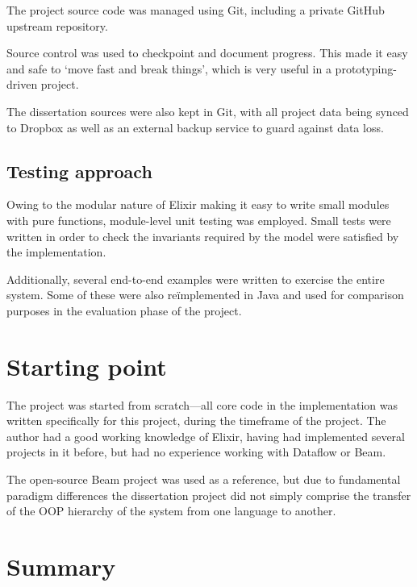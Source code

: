 The project source code was managed using Git, including a private GitHub upstream repository.

Source control was used to checkpoint and document progress.
This made it easy and safe to `move fast and break things', which is very useful in a prototyping-driven project.

The dissertation sources were also kept in Git, with all project data being synced to Dropbox as well as an external backup service to guard against data loss.

\subsection{Testing approach}\label{sec:prep:softeng:testing}

Owing to the modular nature of Elixir making it easy to write small modules with pure functions, module-level unit testing was employed.
Small tests were written in order to check the invariants required by the model were satisfied by the implementation.

Additionally, several end-to-end examples were written to exercise the entire system.
Some of these were also re\"implemented in Java and used for comparison purposes in the evaluation phase of the project.

\section{Starting point}\label{sec:prep:starting}

The project was started from scratch---all core code in the implementation was written specifically for this project, during the timeframe of the project.
The author had a good working knowledge of Elixir, having had implemented several projects in it before, but had no experience working with Dataflow or Beam.

The open-source Beam project was used as a reference, but due to fundamental paradigm differences the dissertation project did not simply comprise the transfer of the OOP hierarchy of the system from one language to another.

\section{Summary}\label{sec:prep:summary}

